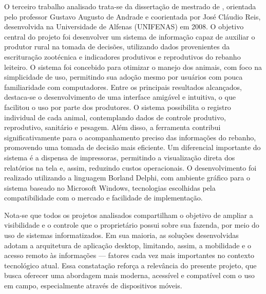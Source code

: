 O terceiro trabalho analisado trata-se da dissertação de mestrado de \cite{Alexandre2008}, orientada pelo professor Gustavo Augusto de Andrade e coorientada por José Cláudio Reis, desenvolvida na Universidade de Alfenas (UNIFENAS) em 2008. O objetivo central do projeto foi desenvolver um sistema de informação capaz de auxiliar o produtor rural na tomada de decisões, utilizando dados provenientes da escrituração zootécnica e indicadores produtivos e reprodutivos do rebanho leiteiro. O sistema foi concebido para otimizar o manejo dos animais, com foco na simplicidade de uso, permitindo sua adoção mesmo por usuários com pouca familiaridade com computadores. Entre os principais resultados alcançados, destaca-se o desenvolvimento de uma interface amigável e intuitiva, o que facilitou o uso por parte dos produtores. O sistema possibilita o registro individual de cada animal, contemplando dados de controle produtivo, reprodutivo, sanitário e pesagem. Além disso, a ferramenta contribui significativamente para o acompanhamento preciso das informações do rebanho, promovendo uma tomada de decisão mais eficiente. Um diferencial importante do sistema é a dispensa de impressoras, permitindo a visualização direta dos relatórios na tela e, assim, reduzindo custos operacionais. O desenvolvimento foi realizado utilizando a linguagem Borland Delphi, com ambiente gráfico para o sistema baseado no Microsoft Windows, tecnologias escolhidas pela compatibilidade com o mercado e facilidade de implementação.

Nota-se que todos os projetos analisados compartilham o objetivo de ampliar a visibilidade e o controle que o proprietário possui sobre sua fazenda, por meio do uso de sistemas informatizados. Em sua maioria, as soluções desenvolvidas adotam a arquitetura de aplicação desktop, limitando, assim, a mobilidade e o acesso remoto às informações — fatores cada vez mais importantes no contexto tecnológico atual. Essa constatação reforça a relevância do presente projeto, que busca oferecer uma abordagem mais moderna, acessível e compatível com o uso em campo, especialmente através de dispositivos móveis.